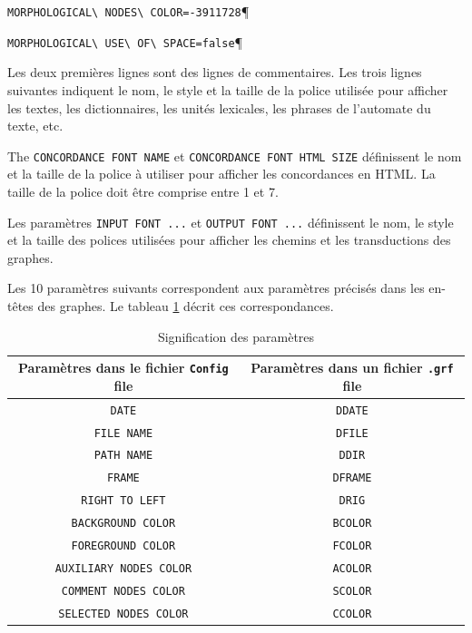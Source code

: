 \verb$MORPHOLOGICAL\ NODES\ COLOR=-3911728$\P

\verb$MORPHOLOGICAL\ USE\ OF\ SPACE=false$\P


\bigskip
\noindent Les deux premières lignes sont des lignes de commentaires. Les trois lignes suivantes
indiquent le nom, le style et la taille de la police utilisée pour afficher les textes, les
dictionnaires, les unités lexicales, les phrases de l’automate du texte, etc.


\bigskip
\noindent The \verb$CONCORDANCE FONT NAME$ et \verb$CONCORDANCE FONT HTML SIZE$ définissent le nom et la taille de la police à utiliser pour afficher les concordances en HTML. La taille de la police doit être comprise entre 1 et 7.



\bigskip
\noindent Les paramètres \verb$INPUT FONT ...$ et \verb$OUTPUT FONT ...$ définissent le nom, le
style et la taille des polices utilisées pour afficher les chemins et les transductions des graphes.



\bigskip
\noindent Les 10 paramètres suivants correspondent aux paramètres précisés dans les en-têtes des
graphes. Le tableau \ref{tab-parameters} décrit ces correspondances.

\begin{table}[h]
\begin{center}
\begin{tabular}{|c|c|}
\hline
Paramètres dans le fichier \verb+Config+ file & Paramètres dans un fichier \verb+.grf+ file
\\
\hline
\verb$DATE$ & \verb$DDATE$
\\
\hline
\verb$FILE NAME$ & \verb$DFILE$
\\
\hline
\verb$PATH NAME$ & \verb$DDIR$
\\
\hline
\verb$FRAME$ & \verb$DFRAME$
\\
\hline
\verb$RIGHT TO LEFT$ & \verb$DRIG$
\\
\hline
\verb$BACKGROUND COLOR$ & \verb$BCOLOR$
\\
\hline
\verb$FOREGROUND COLOR$ & \verb$FCOLOR$
\\
\hline
\verb$AUXILIARY NODES COLOR$ & \verb$ACOLOR$
\\
\hline
\verb$COMMENT NODES COLOR$ & \verb$SCOLOR$
\\
\hline
\verb$SELECTED NODES COLOR$ & \verb$CCOLOR$
\\
\hline
\end{tabular}
\caption{Signification des paramètres\label{tab-parameters}}
\end{center}
\end{table}

